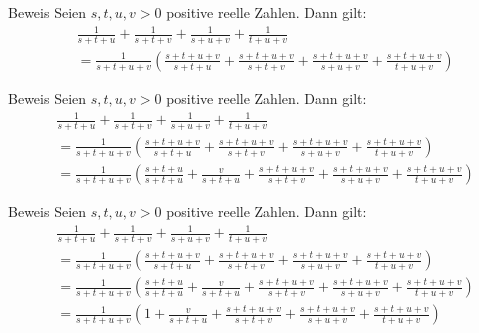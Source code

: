 \documentclass[10pt]{beamer}
\begin{document}
\begin{frame}{Beweis}
    Seien \( s, t, u, v > 0 \) positive reelle Zahlen. Dann gilt:
    \begin{align*}
        & \frac{1}{s + t + u} + \frac{1}{s + t + v} + \frac{1}{s + u + v} + \frac{1}{t + u + v} \\
        & = \frac{1}{s + t + u + v} \left( \frac{s + t + u + v}{s + t + u} + \frac{s + t + u + v}{s + t + v} + \frac{s + t + u + v}{s + u + v} + \frac{s + t + u + v}{t + u + v} \right)
    \end{align*}
\end{frame}



\begin{frame}{Beweis}
    Seien \( s, t, u, v > 0 \) positive reelle Zahlen. Dann gilt:
    \begin{align*}
        & \frac{1}{s + t + u} + \frac{1}{s + t + v} + \frac{1}{s + u + v} + \frac{1}{t + u + v} \\
        & = \frac{1}{s + t + u + v} \left( \frac{s + t + u + v}{s + t + u} + \frac{s + t + u + v}{s + t + v} + \frac{s + t + u + v}{s + u + v} + \frac{s + t + u + v}{t + u + v} \right) \\
        & = \frac{1}{s + t + u + v} \left( \frac{s + t + u}{s + t + u} + \frac{v}{s + t + u} + \frac{s + t + u + v}{s + t + v} + \frac{s + t + u + v}{s + u + v} + \frac{s + t + u + v}{t + u + v} \right)
    \end{align*}
\end{frame}



\begin{frame}{Beweis}
    Seien \( s, t, u, v > 0 \) positive reelle Zahlen. Dann gilt:
    \begin{align*}
        & \frac{1}{s + t + u} + \frac{1}{s + t + v} + \frac{1}{s + u + v} + \frac{1}{t + u + v} \\
        & = \frac{1}{s + t + u + v} \left( \frac{s + t + u + v}{s + t + u} + \frac{s + t + u + v}{s + t + v} + \frac{s + t + u + v}{s + u + v} + \frac{s + t + u + v}{t + u + v} \right) \\
        & = \frac{1}{s + t + u + v} \left( \frac{s + t + u}{s + t + u} + \frac{v}{s + t + u} + \frac{s + t + u + v}{s + t + v} + \frac{s + t + u + v}{s + u + v} + \frac{s + t + u + v}{t + u + v} \right) \\
        & = \frac{1}{s + t + u + v} \left( 1 + \frac{v}{s + t + u} + \frac{s + t + u + v}{s + t + v} + \frac{s + t + u + v}{s + u + v} + \frac{s + t + u + v}{t + u + v} \right)
    \end{align*}
\end{frame}
\end{document}
